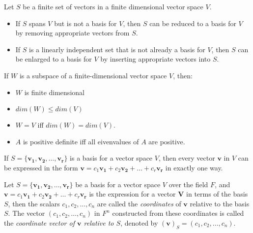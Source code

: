\documentclass{report}
\begin{document}
		\begin{thm}
			Let $S$ be a finite set of vectors in a finite dimensional vector space $V$.
			\begin{itemize}
				\item If $S$ spans $V$ but is not a basis for $V$, then $S$ can be reduced to a basis for $V$ by removing appropriate vectors from $S$.
				\item If $S$ is a linearly independent set that is not already a basis for $V$, then $S$ can be enlarged to a basis for $V$ by inserting appropriate vectors into $S$.
			\end{itemize}
		\end{thm}
		
		\begin{thm}
			If $W$ is a subspace of a finite-dimensional vector space $V$, then:
			\begin{itemize}
				\item $W$ is finite dimensional
				\item $dim(W) \le dim(V)$
				\item $W=V$ iff $dim(W)=dim(V)$.				\item $A$ is positive definite iff all eivenvalues of $A$ are positive.
			\end{itemize}
		\end{thm}
	
		\begin{thm}\label{thm_coordinate_unique}
			If $S=\{\bm{v_1}, \bm{v_2}, \dots, \bm{v_r}\}$ is a basis for a vector space $V$, then every vector $\bm{v}$ in $V$ can be expressed in the form $\bm{v}=c_1\bm{v_1}+c_2\bm{v_2}+\dots+c_r\bm{v_r}$ in exactly one way.
		\end{thm}
	
		\begin{defn}[Coordinate]\label{def_coordinate}
			Let $S=\{\bm{v_1}, \bm{v_2}, \dots, \bm{v_r}\}$ be a basis for a vector space $V$ over the field $F$, and $\bm{v}=c_1\bm{v_1}+c_2\bm{v_2}+\dots+c_r\bm{v_r}$ is the expression for a vector $\bm{V}$ in terms of the basis $S$, then the scalars $c_1,c_2,\dots,c_n$ are called the \emph{coordinates} of $\bm{v}$ relative to the basis $S$. The vector $(c_1,c_2,\dots,c_n)$ in $F^n$ constructed from these coordinates is called the \emph{coordinate vector of $\bm{v}$ relative to $S$}, denoted by $(\bm{v})_S=(c_1,c_2,\dots,c_n)$.
		\end{defn}
		
\end{document}
